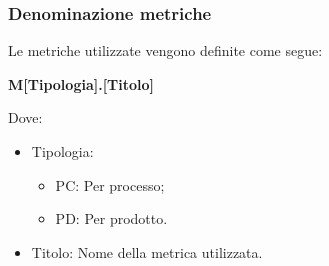 \subsubsection{Denominazione metriche}

Le metriche utilizzate vengono definite come segue:

\begin{center}
    \large{\textbf{M[Tipologia].[Titolo]}}
\end{center}

Dove:

\begin{itemize}
\item Tipologia:
\begin{itemize}
\item PC: Per processo;
\item PD: Per prodotto.
\end{itemize}
\item Titolo: Nome della metrica utilizzata.
\end{itemize}

